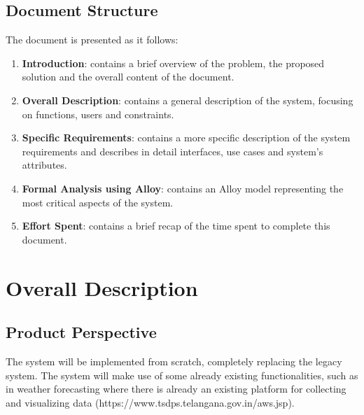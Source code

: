 \documentclass[10pt]{article}
\begin{document}
\subsection{Document Structure}
The document is presented as it follows:
\begin{enumerate}
    \item \textbf{Introduction}: contains a brief overview of the problem, the proposed solution and the overall content of the document.
    \item \textbf{Overall Description}: contains a general description of the system, focusing on functions, users and constraints.
    \item \textbf{Specific Requirements}: contains a more specific description of the system requirements and describes in detail interfaces, use cases and system's attributes.
    \item \textbf{Formal Analysis using Alloy}: contains an Alloy model representing the most critical aspects of the system.
    \item \textbf{Effort Spent}: contains a brief recap of the time spent to complete this document.
\end{enumerate}
\newpage
\section{Overall Description}
\subsection{Product Perspective}
The system will be implemented from scratch, completely replacing the legacy system.
The system will make use of some already existing functionalities, such as in weather forecasting where there is 
already an existing platform for collecting and visualizing data (https://www.tsdps.telangana.gov.in/aws.jsp).
\end{document}

